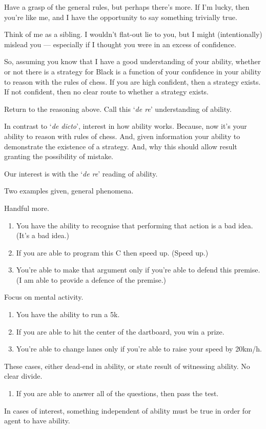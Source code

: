 \begin{note}

  Have a grasp of the general rules, but perhaps there's more.
  If I'm lucky, then you're like me, and I have the opportunity to say something trivially true.

  Think of me as a sibling.
  I wouldn't flat-out lie to you, but I might (intentionally) mislead you --- especially if I thought you were in an excess of confidence.

  So, assuming you know that I have a good understanding of your ability, whether or not there is a strategy for Black is a function of your confidence in your ability to reason with the rules of chess.
  If you are high confident, then a strategy exists.
  If not confident, then no clear route to whether a strategy exists.

  Return to the reasoning above.
  Call this `\emph{de re}' understanding of ability.

  In contrast to `\emph{de dicto}', interest in how ability works.
  Because, now it's your ability to reason with rules of chess.
  And, given information your ability to demonstrate the existence of a strategy.
  And, why this should allow result granting the possibility of mistake.
\end{note}

\begin{note}
  Our interest is with the `\emph{de re}' reading of ability.
  
  Two examples given, general phenomena.

  Handful more.
  \begin{enumerate}
  \item You have the ability to recognise that performing that action is a bad idea. (It's a bad idea.)
  \item If you are able to program this C then speed up. (Speed up.)
  \item You're able to make that argument only if you're able to defend this premise. (I am able to provide a defence of the premise.)
  \end{enumerate}
  Focus on mental activity.
  \begin{enumerate}
  \item You have the ability to run a 5k.
  \item If you are able to hit the center of the dartboard, you win a prize.
  \item You're able to change lanes only if you're able to raise your speed by 20km/h.
  \end{enumerate}
  These cases, either dead-end in ability, or state result of witnessing ability.
  No clear divide.
  \begin{enumerate}
  \item If you are able to answer all of the questions, then pass the test.
  \end{enumerate}
  In cases of interest, something independent of ability must be true in order for agent to have ability.
\end{note}

